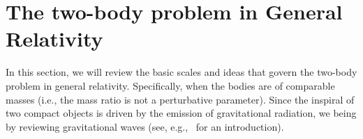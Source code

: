 


\section{The two-body problem in General Relativity}
\label{sec:TwoBody}
In this section, we will review the basic scales and ideas that govern the two-body problem in general relativity. Specifically, when the bodies are of comparable masses (i.e., the mass ratio is not a perturbative parameter). Since the inspiral of two compact objects is driven by the emission of gravitational radiation, we being by reviewing gravitational waves (see, e.g.,~\cite{carrollTextbook} for an introduction).

